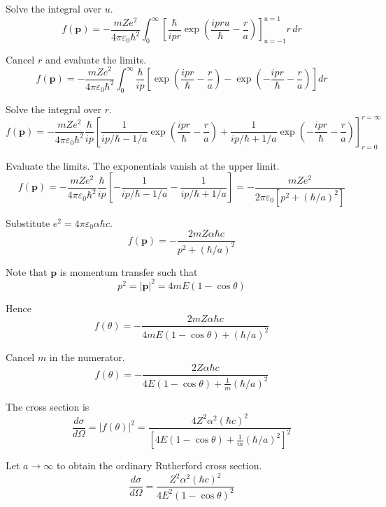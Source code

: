 Solve the integral over $u$.
\begin{equation*}
f(\mathbf p)=-\frac{mZe^2}{4\pi\varepsilon_0\hbar^2}
\int_0^\infty
\left[\frac{\hbar}{ipr}\exp\left(\frac{ipru}{\hbar}-\frac{r}{a}\right)\right]_{u=-1}^{u=1}
r\,dr
\end{equation*}

Cancel $r$ and evaluate the limits.
\begin{equation*}
f(\mathbf p)=-\frac{mZe^2}{4\pi\varepsilon_0\hbar^2}
\int_0^\infty
\frac{\hbar}{ip}
\left[\exp\left(\frac{ipr}{\hbar}-\frac{r}{a}\right)
-\exp\left(-\frac{ipr}{\hbar}-\frac{r}{a}\right)\right]
dr
\end{equation*}

Solve the integral over $r$.
\begin{equation*}
f(\mathbf p)=-\frac{mZe^2}{4\pi\varepsilon_0\hbar^2}
\frac{\hbar}{ip}
\left[
\frac{1}{ip/\hbar-1/a}
\exp\left(\frac{ipr}{\hbar}-\frac{r}{a}\right)
+\frac{1}{ip/\hbar+1/a}
\exp\left(-\frac{ipr}{\hbar}-\frac{r}{a}\right)
\right]_{r=0}^{r=\infty}
\end{equation*}

Evaluate the limits. The exponentials vanish at the upper limit.
\begin{equation*}
f(\mathbf p)=-\frac{mZe^2}{4\pi\varepsilon_0\hbar^2}
\frac{\hbar}{ip}
\left[
-\frac{1}{ip/\hbar-1/a}
-\frac{1}{ip/\hbar+1/a}
\right]
=-\frac{mZe^2}{2\pi\varepsilon_0\left[p^2+(\hbar/a)^2\right]}
\tag{1}
\end{equation*}

Substitute $e^2=4\pi\varepsilon_0\alpha\hbar c$.
\begin{equation*}
f(\mathbf p)=-\frac{2mZ\alpha\hbar c}{p^2+(\hbar/a)^2}
\end{equation*}

Note that $\mathbf p$ is momentum transfer such that
\begin{equation*}
p^2=|\mathbf p|^2=4mE(1-\cos\theta)
\end{equation*}

Hence
\begin{equation*}
f(\theta)=-\frac{2mZ\alpha\hbar c}{4mE(1-\cos\theta)+(\hbar/a)^2}
\tag{2}
\end{equation*}

Cancel $m$ in the numerator.
\begin{equation*}
f(\theta)=-\frac{2Z\alpha\hbar c}{4E(1-\cos\theta)+\frac{1}{m}(\hbar/a)^2}
\end{equation*}

The cross section is
\begin{equation*}
\frac{d\sigma}{d\Omega}=|f(\theta)|^2
=\frac{4Z^2\alpha^2(\hbar c)^2}{\left[4E(1-\cos\theta)+\frac{1}{m}(\hbar/a)^2\right]^2}
\end{equation*}

Let $a\rightarrow\infty$ to obtain the ordinary Rutherford cross section.
\begin{equation*}
\frac{d\sigma}{d\Omega}
=\frac{Z^2\alpha^2(\hbar c)^2}{4E^2(1-\cos\theta)^2}
\end{equation*}


